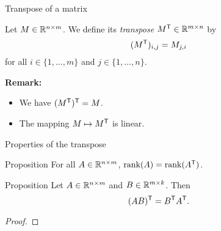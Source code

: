 \documentclass{beamer}
\begin{document}
\begin{frame}[t]{Transpose of a matrix}
	\grid

	\vspace{-0.4cm}
	\begin{definition}
		Let $M \in \mathbb{R}^{n \times m}$. We define its \emph{transpose} $M^{{\sf T}} \in \mathbb{R}^{m \times n}$ by
		$$
		(M^{{\sf T}})_{i,j} = M_{j,i}
		$$
		for all $i \in \{1, \dots, m\}$ and $j \in \{1, \dots, n\}$.
	\end{definition}

	\vspace{3cm}
	\textbf{Remark:}
	\begin{itemize}
		\item We have $(M^{{\sf T}})^{{\sf T}} = M$. 
		\item The mapping $M \mapsto M^{{\sf T}}$ is linear.
	\end{itemize}
\end{frame}


\begin{frame}[t]{Properties of the transpose}
	\grid

	\vspace{-0.4cm}
	\begin{block}{Proposition}
		For all $A \in \mathbb{R}^{n \times m}$, \quad
		${{\rm rank}}(A) = {{\rm rank}}(A^{{\sf T}})$.
	\end{block}

	\begin{block}{Proposition}
		Let $A \in \mathbb{R}^{n \times m}$ and $B \in \mathbb{R}^{m \times k}$. Then
		\vspace{-0.3cm}
		$$
		(AB)^{\sT} = B^{\sT} A^{\sT}.
		\vspace{-0.3cm}
		$$
	\end{block}
	\begin{proof}
		\vspace{2.5cm}
		\vfill
	\end{proof}
\end{frame}

\end{document}
